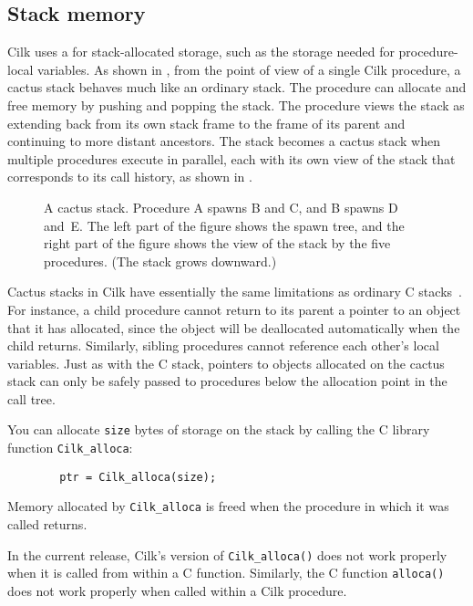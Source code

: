 \subsection{Stack memory}
\label{sec:cactus}

Cilk uses a  \cite{Moses70} for stack-allocated
storage, such as the storage needed for procedure-local variables.  As
shown in , from the point of view of a single Cilk
procedure, a cactus stack behaves much like an ordinary stack.  The
procedure can allocate and free memory by pushing and popping the
stack.  The procedure views the stack as extending back from its own
stack frame to the frame of its parent and continuing to more distant
ancestors.  The stack becomes a cactus stack when multiple procedures
execute in parallel, each with its own view of the stack that
corresponds to its call history, as shown in .

\begin{figure}
\centerline{}
\caption{\small A cactus stack.  Procedure A spawns B and C, and B
spawns D and~E\@.  The left part of the figure shows the spawn tree,
and the right part of the figure shows the view of the stack by the
five procedures.  (The stack grows downward.)}
\label{fig:cactus}
\end{figure}

Cactus stacks in Cilk have essentially the same limitations as
ordinary C stacks~\cite{Moses70}.  For instance, a child procedure
cannot return to its parent a pointer to an object that it has
allocated, since the object will be deallocated automatically when the
child returns.  Similarly, sibling procedures cannot reference each
other's local variables.  Just as with the C stack, pointers to
objects allocated on the cactus stack can only be safely passed to
procedures below the allocation point in the call tree.

You can allocate {\tt size} bytes of storage on the stack by calling
the C library function {\tt Cilk\_alloca}:
\begin{verbatim}
        ptr = Cilk_alloca(size);
\end{verbatim}
Memory allocated by {\tt Cilk\_alloca} is freed when the procedure in
which it was called returns.

In the current release, Cilk's version of \texttt{Cilk\_alloca()} does
not work properly when it is called from within a C function.
Similarly, the C function \texttt{alloca()} does not work properly
when called within a Cilk procedure.


